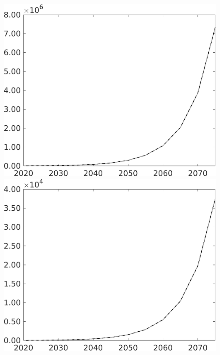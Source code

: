\documentclass[12pt]{article}
\begin{document}
\begin{figure}
\begin{minipage}[]{0.32\textwidth}
\end{minipage}
\begin{minipage}[]{0.32\textwidth}
\includegraphics[width=1\textwidth]{../../codding_model/own_basedOnFried/optimalPol_010922_revision/figures/all_13Sept22/LevTaufNoTauf_TaulCalib_Equlab_regime0_Af_spillover0_nsk0_xgr1_knspil1_sep1_LFlimit0_emsbase0_countec0_GovRev0_etaa0.79_lgd0.png}
\end{minipage}
\begin{minipage}[]{0.32\textwidth}
	\includegraphics[width=1\textwidth]{../../codding_model/own_basedOnFried/optimalPol_010922_revision/figures/all_13Sept22/LevTaufNoTauf_TaulCalib_Equlab_regime0_Ag_spillover0_nsk0_xgr1_knspil1_sep1_LFlimit0_emsbase0_countec0_GovRev0_etaa0.79_lgd0.png}

\end{minipage}
\end{figure}
\end{document}
